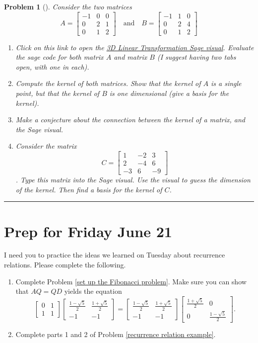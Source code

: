 \documentclass[letterpaper,oneside]{book}%
\theoremstyle{plain}
\theoremstyle{box}
\theoremstyle{problem}
\newtheorem{problemnum}{Problem}[chapter]
\newtheorem*{hwenum*}{Home Work Practice}
\newenvironment{problem}[1][]{\begin{problemnum}[#1]}{\end{problemnum}\nopagebreak\hrule\bigskip}
\newenvironment{hw*}[1][]{\begin{hwenum*}[#1]}{\end{hwenum*}\nopagebreak\hrule\bigskip}
\newcommand{\bvec}[1]{\begin{bmatrix} #1 \end{bmatrix}}
\begin{document}
\begin{problem}
 Consider the two matrices 
 $$
 A = \bvec{-1&0&0\\0&2&1\\0&1&2} 
 \quad\text{and}\quad 
 B = \bvec{-1&1&0\\0&2&4\\0&1&2} 
 $$
 \begin{enumerate}
  \item Click on this link to open the \href{http://bmw.byuimath.com/dokuwiki/doku.php?id=3d_linear_transformations}{3D Linear Transformation Sage visual}. Evaluate the sage code for both matrix $A$ and matrix $B$ (I suggest having two tabs open, with one in each). 
  \item Compute the kernel of both matrices.  Show that the kernel of $A$ is a single point, but that the kernel of $B$ is one dimensional (give a basis for the kernel).
 \item Make a conjecture about the connection between the kernel of a matrix, and the Sage visual.
 \item Consider the matrix
  $$ C = \bvec{1&-2&3\\2&-4&6\\-3&6&-9} $$.  Type this matrix into the Sage visual. Use the visual to guess the dimension of the kernel.  Then find a basis for the kernel of $C$. 
  \end{enumerate}

\end{problem}











 
 
 
 
 








\section{Prep for Friday June 21}



\begin{hw*}
 I need you to practice the ideas we learned on Tuesday about recurrence relations. Please complete the following.
 \begin{enumerate}
  \item Complete Problem \ref{set up the Fibonacci problem}. Make sure you can show that $AQ=QD$ yields the equation
$$\bvec{0&1\\ 1&1}\bvec{\frac{1-\sqrt5}{2}&\frac{1+\sqrt5}{2}\\ -1&-1}=\bvec{\frac{1-\sqrt5}{2}&\frac{1+\sqrt5}{2}\\ -1&-1}\bvec{\frac{1+\sqrt5}{2}&0\\ 0&\frac{1-\sqrt5}{2}}.$$
  \item Complete parts 1 and 2 of Problem \ref{recurrence relation example}.
 \end{enumerate}
\end{hw*}
\end{document}
